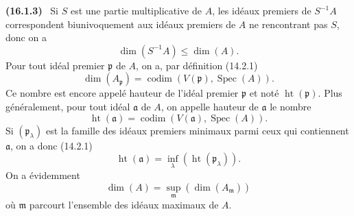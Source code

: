 \documentclass[10pt,oneside]{book}
\makeatletter
\newcommand{\setmanualcurrentlabel}[1]{\def\@currentlabel{#1}}
\newcommand{\oldpage}[2][]{%
  \setcounter{footnote}{0}%
  \marginpar{\scriptsize\textbf{#1}~|~#2}\ignorespaces}
\newenvironment{env}[1][]{\setmanualcurrentlabel{#1}\par\medskip\noindent\textbf{(#1)}\ }{\par}
\makeatother
\begin{document}
\begin{env}[16.1.3]
\label{0.16.1.3-fr}
\oldpage[0\textsubscript{IV-1}]{23}
Si $S$ est une partie multiplicative de $A$, les idéaux premiers de $S^{-1}A$
correspondent biunivoquement aux idéaux premiers de $A$ ne rencontrant pas
$S$, donc on a
\[
\label{0.16.1.3.1-fr}
  \dim(S^{-1}A)\leq\dim(A).
\tag{16.1.3.1}
\]
Pour tout idéal premier $\mathfrak{p}$ de $A$, on a, par définition (14.2.1)
\[
\label{0.16.1.3.2-fr}
  \dim(A_{\mathfrak{p}})
  =\operatorname{codim}(V(\mathfrak{p}),\operatorname{Spec}(A)).
\tag{16.1.3.2}
\]
Ce nombre est encore appelé hauteur de l'idéal premier $\mathfrak{p}$ et noté
$\operatorname{ht}(\mathfrak{p})$. Plus généralement, pour tout idéal
$\mathfrak{a}$ de $A$, on appelle hauteur de $\mathfrak{a}$ le nombre
\[
\label{0.16.1.3.3-fr}
  \operatorname{ht}(\mathfrak{a})
  =\operatorname{codim}(V(\mathfrak{a}),\operatorname{Spec}(A)).
\tag{16.1.3.3}
\]
Si $(\mathfrak{p}_\lambda)$ est la famille des idéaux premiers minimaux parmi
ceux qui contiennent $\mathfrak{a}$, on a donc (14.2.1)
\[
\label{0.16.1.3.4-fr}
  \operatorname{ht}(\mathfrak{a})
  =\inf_\lambda(\operatorname{ht}(\mathfrak{p}_\lambda)).
\tag{16.1.3.4}
\]
On a évidemment
\[
\label{0.16.1.3.5-fr}
  \dim(A)=\sup_{\mathfrak{m}}(\dim(A_{\mathfrak{m}}))
\tag{16.1.3.5}
\]
où $\mathfrak{m}$ parcourt l'ensemble des idéaux maximaux de $A$.
\end{env}
\end{document}
